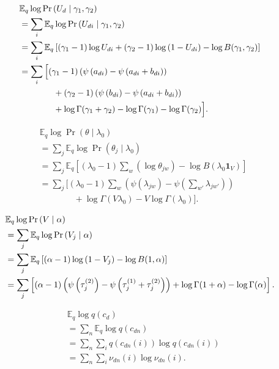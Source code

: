 \documentclass{article}
\newcommand{\one}{\ensuremath{\mathbf{1}}}
\newcommand{\digamma}[1]{\ensuremath{\psi\left(#1\right)}}
\newcommand{\Elogdirichlet}[2]{\ensuremath{\digamma{#1} - \digamma{#2}}}
\newcommand{\Elogbeta}[3]{\Elogdirichlet{\ifnum#3=1\relax#1\else#2\fi}{#1 + #2}}
\newcommand{\Eq}{\ensuremath{\mathbb{E}_q\xspace}}
\begin{document}
\begin{align*}
    &\Eq \log \Pr\left(U_d \mid \gamma_1, \gamma_2\right) \\
    &= \sum_i \Eq \log \Pr\left(U_{di} \mid \gamma_1, \gamma_2\right) \\
    &= \sum_i \Eq \left[ (\gamma_1 - 1) \log U_{di} + (\gamma_2 - 1) \log \left(1 - U_{di}\right) - \log B(\gamma_1, \gamma_2) \right] \\
    &= \sum_i \Big[ (\gamma_1 - 1) \left(\Elogbeta{a_{di}}{b_{di}}{1}\right) \\
    &\qquad\qquad + (\gamma_2 - 1) \left(\Elogbeta{a_{di}}{b_{di}}{2}\right) \\
    &\qquad\qquad + \log \Gamma(\gamma_1 + \gamma_2) - \log \Gamma(\gamma_1) - \log \Gamma(\gamma_2) \Big] .
\end{align*}

\begin{align*}
    &\Eq \log \Pr\left(\theta \mid \lambda_0\right) \\
    &= \sum_j \Eq \log \Pr\left(\theta_j \mid \lambda_0\right) \\
    &= \sum_j \Eq \left[ (\lambda_0 - 1) \sum_w \left( \log \theta_{jw} \right) - \log B\left(\lambda_0 \one_V\right) \right] \\
    &= \sum_j \Bigg[ (\lambda_0 - 1) \sum_w \left( \Elogdirichlet{\lambda_{jw}}{\sum_{w'}{\lambda_{jw'}}} \right) \\
    &\qquad\qquad + \log{\Gamma \left( V \lambda_0 \right)} - V \log \Gamma(\lambda_0) \Bigg] .
\end{align*}

\begin{align*}
    &\Eq \log \Pr\left(V \mid \alpha\right) \\
    &= \sum_j \Eq \log \Pr\left(V_j \mid \alpha\right) \\
    &= \sum_j \Eq \left[ (\alpha - 1) \log \left(1 - V_j\right) - \log B(1, \alpha) \right] \\
    &= \sum_j \left[ (\alpha - 1) \left(\Elogbeta{\tau_j^{(1)}}{\tau_j^{(2)}}{2}\right) + \log \Gamma(1 + \alpha) - \log \Gamma(\alpha) \right] .
\end{align*}

\begin{align*}
    &\Eq \log q\left(c_d\right) \\
    &= \sum_n \Eq \log q\left(c_{dn}\right) \\
    &= \sum_n \sum_i q\left(c_{dn}(i)\right) \log q\left(c_{dn}(i)\right) \\
    &= \sum_n \sum_i \nu_{dn}(i) \log \nu_{dn}(i) .
\end{align*}
\end{document}
